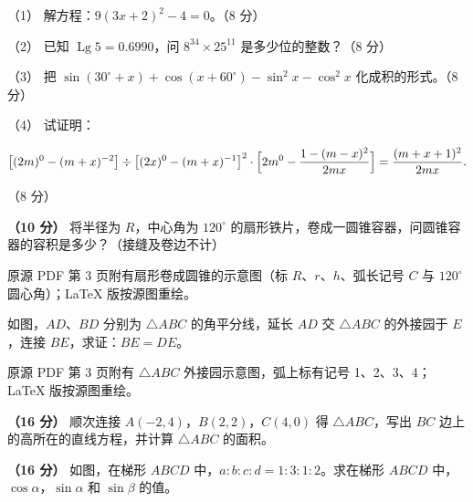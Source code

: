 \begin{question}

（1） 解方程：$9(3x+2)^2-4=0$。（8 分）

（2） 已知 $\operatorname{Lg}5=0.6990$，问 $8^{34}\times25^{11}$ 是多少位的整数？（8 分）

（3） 把 $\sin(30^\circ+x)+\cos(x+60^\circ)-\sin^2x-\cos^2x$ 化成积的形式。（8 分）

（4） 试证明：

\nopagebreak[4]
\[
\bigl[(2m)^0-(m+x)^{-2}\bigr]\div\bigl[(2x)^0-(m+x)^{-1}\bigr]^2\cdot\Bigl[2m^0-\frac{1-(m-x)^2}{2mx}\Bigr]=\frac{(m+x+1)^2}{2mx}.
\]

（8 分）

\Needspace{0.4\textheight}
\end{question}
\begin{question}
\textbf{（10 分）} 将半径为 $R$，中心角为 $120^\circ$ 的扇形铁片，卷成一圆锥容器，问圆锥容器的容积是多少？（接缝及卷边不计）

\begin{gktip}
原源 PDF 第 3 页附有扇形卷成圆锥的示意图（标 $R$、$r$、$h$、弧长记号 $C$ 与 $120^\circ$ 圆心角）；LaTeX 版按源图重绘。
\end{gktip}
\nopagebreak[4]
\begin{center}\end{center}
\nopagebreak[4]
\Needspace{0.4\textheight}
\end{question}
\begin{question}
如图，$AD\text{、}BD$ 分别为 $\triangle ABC$ 的角平分线，延长 $AD$ 交 $\triangle ABC$ 的外接园于 $E$，连接 $BE$，求证：$BE=DE$。

\begin{gktip}
原源 PDF 第 3 页附有 $\triangle ABC$ 外接园示意图，弧上标有记号 1、2、3、4；LaTeX 版按源图重绘。
\end{gktip}
\nopagebreak[4]
\begin{center}\end{center}
\nopagebreak[4]
\end{question}
\begin{question}
\textbf{（16 分）} 顺次连接 $A(-2,4)$，$B(2,2)$，$C(4,0)$ 得 $\triangle ABC$，写出 $BC$ 边上的高所在的直线方程，并计算 $\triangle ABC$ 的面积。

\end{question}
\begin{question}
\textbf{（16 分）} 如图，在梯形 $ABCD$ 中，$a:b:c:d=1:3:1:2$。求在梯形 $ABCD$ 中，$\cos\alpha$，$\sin\alpha$ 和 $\sin\beta$ 的值。

\end{question}
